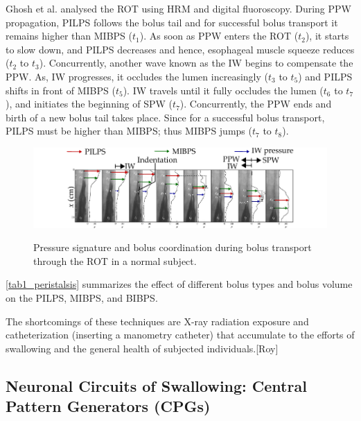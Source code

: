 Ghosh et al. \cite{ghosh2006physiology} analysed the \ac{ROT} using \ac{HRM} and digital fluoroscopy. During \ac{PPW} propagation, \ac{PILPS} follows the bolus tail and for successful bolus transport it remains higher than \ac{MIBPS} ($t_1$). As soon as \ac{PPW} enters the ROT ($ t_2$), it starts to slow down, and \ac{PILPS} decreases and hence, esophageal muscle squeeze reduces ($ t_2$ to $t_3$). Concurrently, another wave known as the \ac{IW} begins to compensate the \ac{PPW}. As, IW progresses, it occludes the lumen increasingly ($ t_3$ to $t_5 $) and \ac{PILPS} shifts in front of \ac{MIBPS} ($ t_5 $). IW travels until it fully occludes the lumen ($ t_6$ to $t_7$), and initiates the beginning of \ac{SPW} ($ t_7 $). Concurrently, the \ac{PPW} ends and birth of a new bolus tail takes place. Since for a successful bolus transport, \ac{PILPS} must be higher than \ac{MIBPS}; thus  \ac{MIBPS} jumps ($ t_7$ to $t_8 $). 

\begin{figure}[bth]
	\myfloatalign
	{\includegraphics[width=\linewidth]{images/Ch2/fig5_ROT}} \quad
	\caption[Pressure signature and bolus coordination during bolus transport through the Region of Transition (ROT) in a normal subject.]{Pressure signature and bolus coordination during bolus transport through the ROT in a normal subject. \citep{ghosh2006physiology}}\label{fig5_ROT}
\end{figure}

\autoref{tab1_peristalsis} summarizes the effect of different bolus types and bolus volume on the \ac{PILPS}, \ac{MIBPS}, and \ac{BIBPS}. 



The shortcomings of these techniques are X-ray radiation exposure and catheterization (inserting a manometry catheter) that accumulate to the efforts of swallowing and the general health of subjected individuals.[Roy]

\subsection{Neuronal Circuits of Swallowing: Central Pattern Generators (CPGs)}

